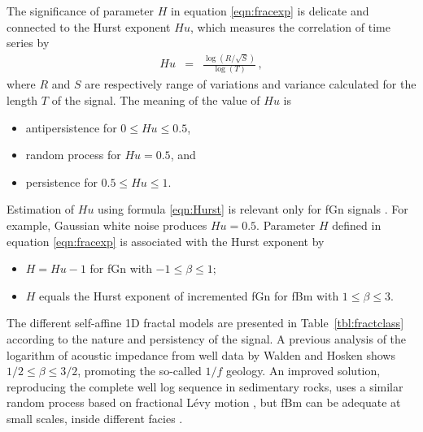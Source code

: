 The significance of parameter $H$ in equation \ref{eqn:fracexp} is delicate and connected to the Hurst exponent $Hu$,
which measures the correlation of time series \cite[]{Hurst_51} by
\begin{eqnarray}
Hu & = & \frac{\log\left(R/\sqrt{S}\right)}{\log(T)}\,, \label{eqn:Hurst}
\end{eqnarray}
where $R$ and $S$ are respectively range of variations and variance
calculated for the length $T$ of the signal. The meaning of the value of $Hu$ is 
\begin{itemize} 
\item antipersistence for $0\leq Hu\leq 0.5$,
\item random process for $Hu=0.5$, and
\item persistence for $0.5\leq Hu\leq 1$.
\end{itemize}
Estimation of $Hu$ using formula \ref{eqn:Hurst} is relevant only for fGn signals \cite[]{Turcotte_97}.
For example, Gaussian white noise produces $Hu=0.5$.
Parameter $H$ defined in equation \ref{eqn:fracexp} is associated with the Hurst exponent by
\begin{itemize} 
\item $H=Hu-1$ for fGn with $-1\leq\beta\leq 1$;
\item $H$ equals the Hurst exponent of incremented fGn \cite[]{Li_03} for fBm with $1\leq\beta\leq 3$.
\end{itemize}
The different self-affine 1D fractal models are presented in Table~\ref{tbl:fractclass}
according to the nature and persistency of the signal.
A previous analysis of the logarithm of acoustic impedance from well data
by Walden and Hosken  shows $1/2 \leq \beta \leq 3/2$, promoting the so-called $1/f$ geology.
An improved solution, reproducing the complete well log sequence in sedimentary rocks, uses
a similar random process based on fractional L\'evy motion \cite[]{Painter_P94}, 
but fBm can be adequate at small scales, inside different facies \cite[]{Lu_MFC02}.
 
